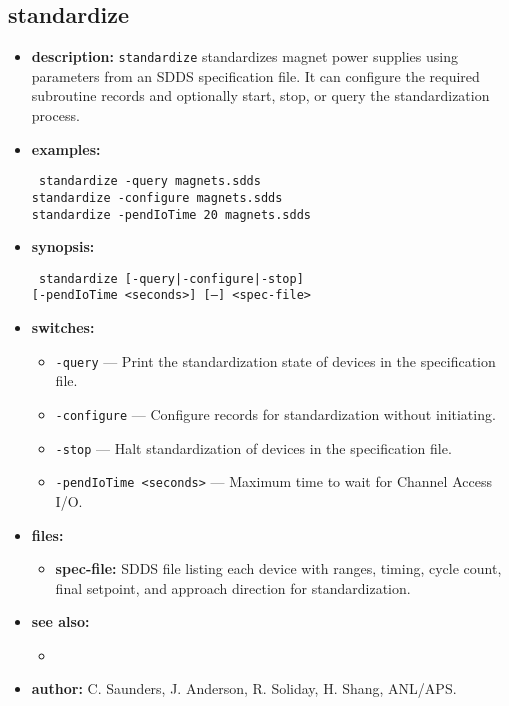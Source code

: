 \begin{latexonly}
\newpage
\end{latexonly}

\subsection{standardize}
\label{standardize}

\begin{itemize}
\item {\bf description:}
\verb+standardize+ standardizes magnet power supplies using parameters from an SDDS specification file.
It can configure the required subroutine records and optionally start, stop, or query the standardization process.

\item {\bf examples:}
  \begin{flushleft}{\tt
    standardize -query magnets.sdds\\
    standardize -configure magnets.sdds\\
    standardize -pendIoTime 20 magnets.sdds
  }\end{flushleft}

\item {\bf synopsis:}
  \begin{flushleft}{\tt
    standardize [-query|-configure|-stop]\\
    \phantom{standardize }[-pendIoTime <seconds>] [--] <spec-file>
  }\end{flushleft}

\item {\bf switches:}
  \begin{itemize}
  \item {\tt -query} --- Print the standardization state of devices in the specification file.
  \item {\tt -configure} --- Configure records for standardization without initiating.
  \item {\tt -stop} --- Halt standardization of devices in the specification file.
  \item {\tt -pendIoTime <seconds>} --- Maximum time to wait for Channel Access I/O.
  \end{itemize}

\item {\bf files:}
  \begin{itemize}
  \item {\bf spec-file:} SDDS file listing each device with ranges, timing, cycle count, final setpoint, and approach direction for standardization.
  \end{itemize}

\item {\bf see also:}
  \begin{itemize}
  \item {}
  \end{itemize}

\item {\bf author:} C. Saunders, J. Anderson, R. Soliday, H. Shang, ANL/APS.
\end{itemize}
